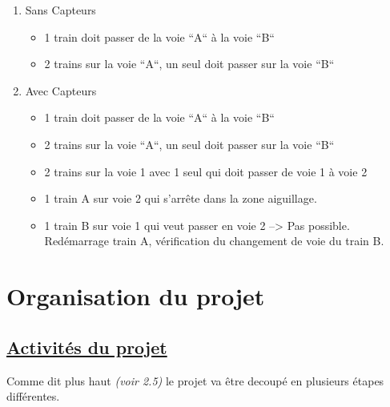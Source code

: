 \begin{enumerate}[A]
  \item Sans Capteurs
  \begin{itemize}
    \item 1 train doit passer de la voie ``A`` à la voie ``B``
    \item 2 trains sur la voie ``A``, un seul doit passer sur la voie
       ``B``
  \end{itemize}

  \item Avec Capteurs
  \begin{itemize}
    \item 1 train doit passer de la voie ``A`` à la voie ``B``
    \item 2 trains sur la voie ``A``, un seul doit passer sur la voie ``B``
    \item 2 trains sur la voie 1 avec 1 seul qui doit passer de voie 1 à voie 2
    \item 1 train A sur voie 2 qui s'arrête dans la zone aiguillage.
    \item 1 train B sur voie 1 qui veut passer en voie 2 --> Pas
       possible. Red\'emarrage train A, v\'erification du changement de
       voie du train B.
  \end{itemize}
\end{enumerate}

\section{Organisation du projet}
\label{sec:org_proj}

\subsection{\underline{ Activit\'es du projet}}
\label{sec:activ}

Comme dit plus haut \emph{(voir 2.5)} le projet va \^etre decoup\'e en
plusieurs \'etapes diff\'erentes.

